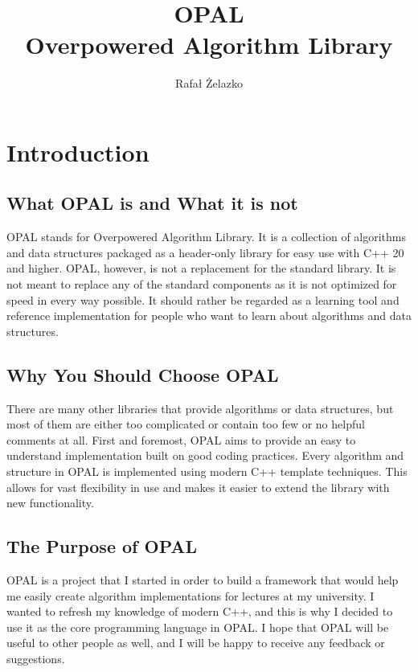 \documentclass[titlepage, a4paper, 12pt]{article}
\title{
    OPAL \\
    \large{Overpowered Algorithm Library}
}
\author{Rafał Żelazko}
\begin{document}
    \maketitle

    \tableofcontents
    
    \clearpage
    \section{Introduction}

    \subsection{What OPAL is and What it is not}

    OPAL stands for Overpowered Algorithm Library. It is a collection of algorithms and data structures packaged as a header-only library for easy use with C++ 20 and higher. OPAL, however, is not a replacement for the standard library. It is not meant to replace any of the standard components as it is not optimized for speed in every way possible. It should rather be regarded as a learning tool and reference implementation for people who want to learn about algorithms and data structures.

    \subsection{Why You Should Choose OPAL}

    There are many other libraries that provide algorithms or data structures, but most of them are either too complicated or contain too few or no helpful comments at all. First and foremost, OPAL aims to provide an easy to understand implementation built on good coding practices. Every algorithm and structure in OPAL is implemented using modern C++ template techniques. This allows for vast flexibility in use and makes it easier to extend the library with new functionality.

    \subsection{The Purpose of OPAL}

    OPAL is a project that I started in order to build a framework that would help me easily create algorithm implementations for lectures at my university. I wanted to refresh my knowledge of modern C++, and this is why I decided to use it as the core programming language in OPAL. I hope that OPAL will be useful to other people as well, and I will be happy to receive any feedback or suggestions.
\end{document}
